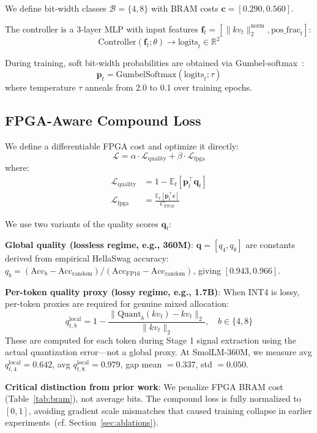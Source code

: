 \documentclass{article}
\begin{document}
We define bit-width classes $\mathcal{B} = \{4, 8\}$ with BRAM costs $\mathbf{c} = [0.290, 0.560]$.

The controller is a 3-layer MLP with input features $\mathbf{f}_t = [\|kv_t\|_2^\text{norm}, \text{pos\_frac}_t]$:
\[
\text{Controller}(\mathbf{f}_t; \theta) \to \text{logits}_t \in \mathbb{R}^2
\]

During training, soft bit-width probabilities are obtained via Gumbel-softmax~\citep{jang2017gumbel}:
\[
\mathbf{p}_t = \text{GumbelSoftmax}(\text{logits}_t; \tau)
\]
where temperature $\tau$ anneals from 2.0 to 0.1 over training epochs.

\subsection{FPGA-Aware Compound Loss}

We define a differentiable FPGA cost and optimize it directly:
\[
\mathcal{L} = \alpha \cdot \mathcal{L}_\text{quality} + \beta \cdot \mathcal{L}_\text{fpga}
\]
where:
\begin{align}
\mathcal{L}_\text{quality} &= 1 - \mathbb{E}_t\left[\mathbf{p}_t^\top \mathbf{q}_t\right] \\
\mathcal{L}_\text{fpga} &= \frac{\mathbb{E}_t[\mathbf{p}_t^\top \mathbf{c}]}{C_\text{FP16}}
\end{align}

We use two variants of the quality scores $\mathbf{q}_t$:

\textbf{Global quality (lossless regime, e.g., 360M)}: $\mathbf{q} = [q_4, q_8]$ are constants derived from empirical HellaSwag accuracy: $q_b = (\text{Acc}_b - \text{Acc}_\text{random}) / (\text{Acc}_\text{FP16} - \text{Acc}_\text{random})$, giving $[0.943, 0.966]$.

\textbf{Per-token quality proxy (lossy regime, e.g., 1.7B)}: When INT4 is lossy, per-token proxies are required for genuine mixed allocation:
\[
q_{t,b}^\text{local} = 1 - \frac{\|\text{Quant}_b(kv_t) - kv_t\|_2}{\|kv_t\|_2}, \quad b \in \{4, 8\}
\]
These are computed for each token during Stage 1 signal extraction using the actual quantization error---not a global proxy. At SmolLM-360M, we measure avg $q_{t,4}^\text{local} = 0.642$, avg $q_{t,8}^\text{local} = 0.979$, gap mean $= 0.337$, std $= 0.050$.

\textbf{Critical distinction from prior work}: We penalize FPGA BRAM cost (Table~\ref{tab:bram}), not average bits. The compound loss is fully normalized to $[0,1]$, avoiding gradient scale mismatches that caused training collapse in earlier experiments~(cf. Section~\ref{sec:ablations}).
\end{document}
